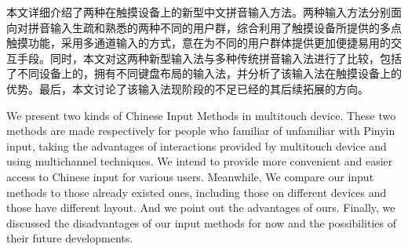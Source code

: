 

\cleardoublepage
\begin{cabstract}

  本文详细介绍了两种在触摸设备上的新型中文拼音输入方法。两种输入方法分别面向对拼音输入生疏和熟悉的两种不同的用户群，综合利用了触摸设备所提供的多点触摸功能，采用多通道输入的方式，意在为不同的用户群体提供更加便捷易用的交互手段。同时，本文对这两种新型输入法与多种传统拼音输入法进行了比较，包括了不同设备上的，拥有不同键盘布局的输入法，并分析了该输入法在触摸设备上的优势。最后，本文讨论了该输入法现阶段的不足已经的其后续拓展的方向。

\end{cabstract}

\cleardoublepage
\begin{eabstract}

  We present two kinds of Chinese Input Methods in multitouch device. These two methods are made respectively for people who familiar of unfamiliar with Pinyin input, taking the advantages of interactions provided by multitouch device and using multichannel techniques. We intend to provide more convenient and easier access to Chinese input for various users. Meanwhile, We compare our input methods to those already existed ones, including those on different devices and those have different layout. And we point out the advantages of ours. Finally, we discussed the disadvantages of our input methods for now and the possibilities of their future developments.

\end{eabstract}
